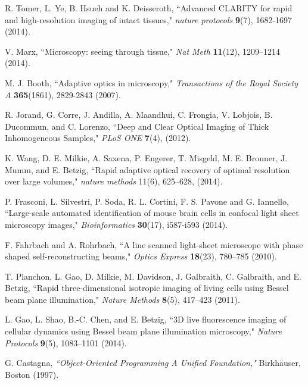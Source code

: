 \documentclass[12pt]{spieman}  %
\begin{document}
\begin{thebibliography}{0}
 R. Tomer, L. Ye, B. Hsueh and K. Deisseroth, ``Advanced CLARITY for rapid and high-resolution imaging of intact tissues," \emph{nature protocols} \textbf{9}(7), 1682-1697 (2014).

 V. Marx, ``Microscopy: seeing through tissue," \emph{Nat Meth} \textbf{11}(12), 1209–1214 (2014).

 M. J. Booth, ``Adaptive optics in microscopy," \emph{Transactions of the Royal Society A} \textbf{365}(1861), 2829-2843 (2007).

 R. Jorand, G. Corre, J. Andilla, A. Maandhui, C. Frongia, V. Lobjois, B. Ducommun, and C. Lorenzo, ``Deep and Clear Optical Imaging of Thick Inhomogeneous Samples," \emph{PLoS ONE} \textbf{7}(4), (2012).

 K. Wang, D. E. Milkie, A. Saxena, P. Engerer, T. Misgeld, M. E. Bronner, J. Mumm, and E. Betzig, ``Rapid adaptive optical recovery of optimal resolution over large volumes," \emph{nature methods} 11(6), 625–628, (2014).

 P. Frasconi, L. Silvestri, P. Soda, R. L. Cortini, F. S. Pavone and G. Iannello, ``Large-scale automated identification of mouse brain cells in confocal light sheet microscopy images," \emph{Bioinformatics} \textbf{30}(17), i587-i593 (2014).

 F. Fahrbach and A. Rohrbach, ``A line scanned light-sheet microscope with phase shaped self-reconstructing beams," \emph{Optics Express} \textbf{18}(23), 780–785 (2010).

 T. Planchon, L. Gao, D. Milkie, M. Davidson, J. Galbraith, C. Galbraith, and E. Betzig, ``Rapid three-dimensional isotropic imaging of living cells using Bessel beam plane illumination," \emph{Nature Methods} \textbf{8}(5), 417–423 (2011).

 L. Gao, L. Shao, B.-C. Chen, and E. Betzig, ``3D live fluorescence imaging of cellular dynamics using Bessel beam plane illumination microscopy," \emph{Nature Protocols} \textbf{9}(5), 1083–1101 (2014).



 G. Castagna, \emph{``Object-Oriented Programming A Unified Foundation,"} Birkh{\"a}user, Boston (1997).

\end{thebibliography}


\end{document}
